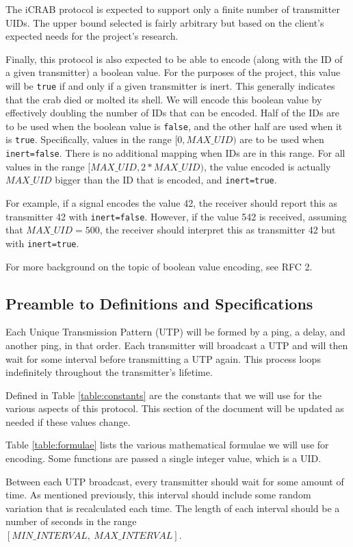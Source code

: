 \documentclass[12pt]{article}
\begin{document}
The iCRAB protocol is expected to support only a finite number of transmitter
UIDs.
The upper bound selected is fairly arbitrary but based on the client's expected
needs for the project's research.

Finally, this protocol is also expected to be able to encode (along with the
ID of a given transmitter) a boolean value.
For the purposes of the project, this value will be \texttt{true}
if and only if a given  transmitter is inert.
This generally indicates that the crab died or molted its shell.
We will encode this boolean value by effectively doubling the number of IDs
that can be encoded.
Half of the IDs are to be used when the boolean value is \texttt{false},
and the other half are used when it is \texttt{true}.
Specifically, values in the range $[0, MAX\_UID)$ are to be used when
\texttt{inert=false}.
There is no additional mapping when IDs are in this range.
For all values in the range $[MAX\_UID, 2*MAX\_UID)$, the value encoded is
actually $MAX\_UID$ bigger than the ID that is encoded, and
\texttt{inert=true}.

For example, if a signal encodes the value 42, the receiver should report
this as transmitter 42 with \texttt{inert=false}.
However, if the value 542 is received, assuming that $MAX\_UID=500$,
the receiver should interpret this as transmitter 42 but with
\texttt{inert=true}.

For more background on the topic of boolean value encoding, see RFC 2.

\subsection{Preamble to Definitions and Specifications} \label{preamble}

Each Unique Transmission Pattern (UTP) will be formed by a ping, a delay,
and another ping, in that order.
Each transmitter will broadcast a UTP and will then wait for some interval
before transmitting a UTP again.
This process loops indefinitely throughout the transmitter's lifetime.

Defined in Table \ref{table:constants} are the constants that we will use for
the various aspects of this protocol.
This section of the document will be updated as needed if these values
change.

Table \ref{table:formulae} lists the various mathematical formulae we will
use for encoding.
Some functions are passed a single integer value, which is a UID.

Between each UTP broadcast, every transmitter should wait for some amount
of time.
As mentioned previously, this interval should include some random variation
that is recalculated each time.
The length of each interval should be a number of seconds in the range\\
$[MIN\_INTERVAL,\ MAX\_INTERVAL]$.
\end{document}
